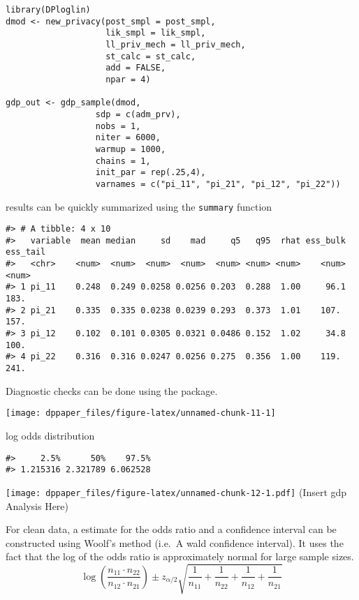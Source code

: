 \begin{verbatim}
library(DPloglin)
dmod <- new_privacy(post_smpl = post_smpl,
                    lik_smpl = lik_smpl,
                    ll_priv_mech = ll_priv_mech,
                    st_calc = st_calc,
                    add = FALSE,
                    npar = 4)

gdp_out <- gdp_sample(dmod,
                  sdp = c(adm_prv),
                  nobs = 1,
                  niter = 6000,
                  warmup = 1000,
                  chains = 1,
                  init_par = rep(.25,4),
                  varnames = c("pi_11", "pi_21", "pi_12", "pi_22"))
\end{verbatim}

results can be quickly summarized using the \texttt{summary} function

\begin{verbatim}
#> # A tibble: 4 x 10
#>   variable  mean median     sd    mad     q5   q95  rhat ess_bulk ess_tail
#>   <chr>    <num>  <num>  <num>  <num>  <num> <num> <num>    <num>    <num>
#> 1 pi_11    0.248  0.249 0.0258 0.0256 0.203  0.288  1.00     96.1     183.
#> 2 pi_21    0.335  0.335 0.0238 0.0239 0.293  0.373  1.01    107.      157.
#> 3 pi_12    0.102  0.101 0.0305 0.0321 0.0486 0.152  1.02     34.8     100.
#> 4 pi_22    0.316  0.316 0.0247 0.0256 0.275  0.356  1.00    119.      241.
\end{verbatim}

Diagnostic checks can be done using the  package.

\begin{center}\texttt{[image: dppaper\_files/figure-latex/unnamed-chunk-11-1]} \end{center}

log odds distribution

\begin{verbatim}
#>     2.5%      50%    97.5% 
#> 1.215316 2.321789 6.062528
\end{verbatim}

\texttt{[image: dppaper\_files/figure-latex/unnamed-chunk-12-1.pdf]}
(Insert gdp Analysis Here)

For clean data, a estimate for the odds ratio and a confidence interval
can be constructed using Woolf's method (i.e.~A wald confidence interval).
It uses the fact that the log of the odds ratio is approximately
normal for large sample sizes.
\[
\log\left(\dfrac{n_{11} \cdot n_{22}}{n_{12} \cdot n_{21}}\right) 
  \pm z_{\alpha/2}\sqrt{\dfrac{1}{n_{11}} + \dfrac{1}{n_{22}} + \dfrac{1}{n_{12}} + \dfrac{1}{n_{21}}}
\]

